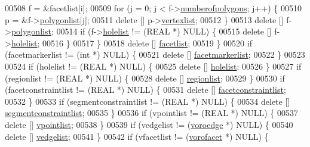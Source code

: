 \begin{DoxyCode}
00508         f = &facetlist[i];
00509         \textcolor{keywordflow}{for} (j = 0; j < f->\hyperlink{structtetgenio_1_1facet_a845d93a1341532b2f0de8b1e75a5d0bb}{numberofpolygons}; j++) \{
00510           p = &f->\hyperlink{structtetgenio_1_1facet_ad73474fc4f07efdd714f0441948c5dfa}{polygonlist}[j];
00511           \textcolor{keyword}{delete} [] p->\hyperlink{structtetgenio_1_1polygon_a3cc2d3756bc093db5c252dd8f42a5001}{vertexlist};
00512         \}
00513         \textcolor{keyword}{delete} [] f->\hyperlink{structtetgenio_1_1facet_ad73474fc4f07efdd714f0441948c5dfa}{polygonlist};
00514         \textcolor{keywordflow}{if} (f->\hyperlink{structtetgenio_1_1facet_aecc34fbcd7087b45baecf2ba43d57757}{holelist} != (REAL *) NULL) \{
00515           \textcolor{keyword}{delete} [] f->\hyperlink{structtetgenio_1_1facet_aecc34fbcd7087b45baecf2ba43d57757}{holelist};
00516         \}
00517       \}
00518       \textcolor{keyword}{delete} [] \hyperlink{classtetgenio_ad65489b9aece6ba14ff8e3c89f533ced}{facetlist};
00519     \}
00520     \textcolor{keywordflow}{if} (facetmarkerlist != (\textcolor{keywordtype}{int} *) NULL) \{
00521       \textcolor{keyword}{delete} [] \hyperlink{classtetgenio_a0d5d9d0718980f8e9d4ecc3e771abba0}{facetmarkerlist};
00522     \}
00523 
00524     \textcolor{keywordflow}{if} (holelist != (REAL *) NULL) \{
00525       \textcolor{keyword}{delete} [] \hyperlink{classtetgenio_a395bd7fc3f66dd013efd5176a0d54265}{holelist};
00526     \}
00527     \textcolor{keywordflow}{if} (regionlist != (REAL *) NULL) \{
00528       \textcolor{keyword}{delete} [] \hyperlink{classtetgenio_a74b5593324c79ad60d9bb0951afb2b41}{regionlist};
00529     \}
00530     \textcolor{keywordflow}{if} (facetconstraintlist != (REAL *) NULL) \{
00531       \textcolor{keyword}{delete} [] \hyperlink{classtetgenio_aabfef9df7956218bcb98ee39f1a9814b}{facetconstraintlist};
00532     \}
00533     \textcolor{keywordflow}{if} (segmentconstraintlist != (REAL *) NULL) \{
00534       \textcolor{keyword}{delete} [] \hyperlink{classtetgenio_ab63298ebb6904d1dfa8ddebb13440ef7}{segmentconstraintlist};
00535     \}
00536     \textcolor{keywordflow}{if} (vpointlist != (REAL *) NULL) \{
00537       \textcolor{keyword}{delete} [] \hyperlink{classtetgenio_afecb51e1302b9006eba50bc2a995b372}{vpointlist};
00538     \}
00539     \textcolor{keywordflow}{if} (vedgelist != (\hyperlink{structtetgenio_1_1voroedge}{voroedge} *) NULL) \{
00540       \textcolor{keyword}{delete} [] \hyperlink{classtetgenio_ab9abf598dc77ffd6754cc087f32bcc98}{vedgelist};
00541     \}
00542     \textcolor{keywordflow}{if} (vfacetlist != (\hyperlink{structtetgenio_1_1vorofacet}{vorofacet} *) NULL) \{

\end{DoxyCode}
